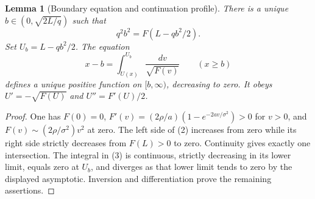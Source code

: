 \documentclass[11pt,a4paper]{article}
\newtheorem{lemma}[theorem]{Lemma}
\theoremstyle{definition}
\theoremstyle{remark}
\begin{document}
\begin{lemma}[Boundary equation and continuation profile]
There is a unique $b\in(0,\sqrt{2L/q})$ such that
\[
 q^2b^2=F(L-qb^2/2).\tag{2}
\]
Set $U_b=L-qb^2/2$. The equation
\[
 x-b=\int_{U(x)}^{U_b}\frac{dv}{\sqrt{F(v)}}\qquad(x\geq b)\tag{3}
\]
defines a unique positive function on $[b,\infty)$, decreasing to zero. It obeys $U'=-\sqrt{F(U)}$ and $U''=F'(U)/2$.
\end{lemma}
\begin{proof}
One has $F(0)=0$, $F'(v)=(2\rho/a)(1-e^{-2av/\sigma^2})>0$ for $v>0$, and $F(v)\sim(2\rho/\sigma^2)v^2$ at zero. The left side of (2) increases from zero while its right side strictly decreases from $F(L)>0$ to zero. Continuity gives exactly one intersection. The integral in (3) is continuous, strictly decreasing in its lower limit, equals zero at $U_b$, and diverges as that lower limit tends to zero by the displayed asymptotic. Inversion and differentiation prove the remaining assertions.
\end{proof}
\end{document}
